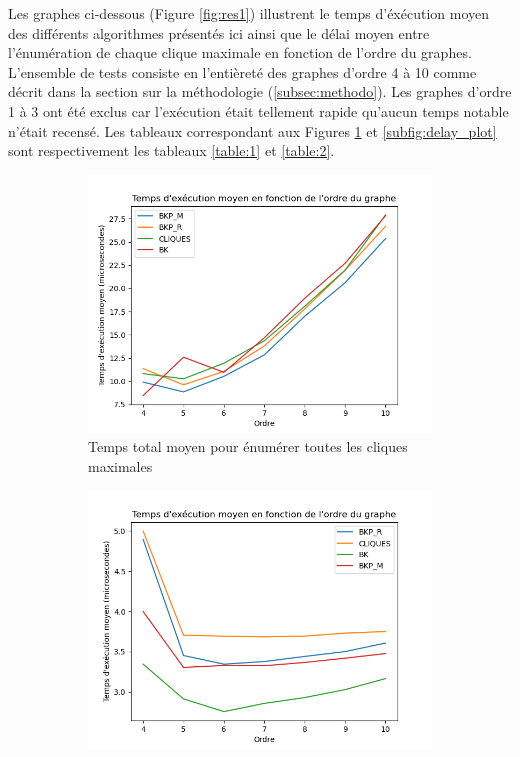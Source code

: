 \documentclass[12pt,a4paper]{article}
\begin{document}
Les graphes ci-dessous (Figure \ref{fig:res1}) illustrent le temps d'éxécution moyen des différents algorithmes présentés ici ainsi que le délai moyen entre l'énumération de chaque clique maximale en fonction de l'ordre du graphes. L'ensemble de tests consiste en l'entièreté des graphes d'ordre 4 à 10 comme décrit dans la section sur la méthodologie (\ref{subsec:methodo}). Les graphes d'ordre 1 à 3 ont été exclus car l'exécution était tellement rapide qu'aucun temps notable n'était recensé.
Les tableaux correspondant aux Figures \ref{subfig:total_plot} et \ref{subfig:delay_plot} sont respectivement les tableaux \ref{table:1} et \ref{table:2}.

\begin{figure}[h!]
    \centering
    \begin{subfigure}[b]{0.49\textwidth}
        \centering
        \includegraphics[width=\textwidth]{images/total_plot.png}
        \caption{Temps total moyen pour énumérer toutes les cliques maximales}
        \label{subfig:total_plot}
    \end{subfigure}
    \hfill
    \begin{subfigure}[b]{0.49\textwidth}
        \centering
        \includegraphics[width=\textwidth]{images/delay_plot.png}

\end{subfigure}
\end{figure}
\end{document}
